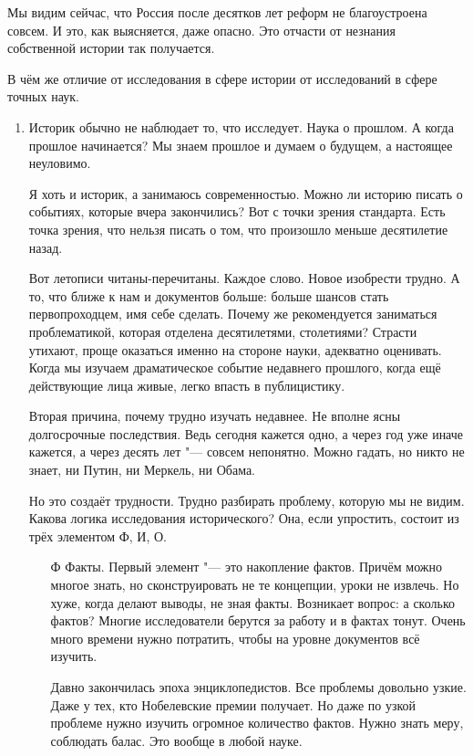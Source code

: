 Мы видим сейчас, что Россия после десятков лет реформ не благоустроена совсем. И это, как выясняется, даже опасно. Это отчасти от незнания собственной истории так получается.

В чём же отличие от исследования в сфере истории от исследований в сфере точных наук.
\begin{enumerate}
\item Историк обычно не наблюдает то, что исследует. Наука о прошлом. А когда прошлое начинается? Мы знаем прошлое и думаем о будущем, а настоящее неуловимо.

Я хоть и историк, а занимаюсь современностью. Можно ли историю писать о событиях, которые вчера закончились? Вот с точки зрения стандарта. Есть точка зрения, что нельзя писать о том, что произошло меньше десятилетие назад.

Вот летописи читаны-перечитаны. Каждое слово. Новое изобрести трудно. А то, что ближе к нам и документов больше: больше шансов стать первопроходцем, имя себе сделать. Почему же рекомендуется заниматься проблематикой, которая отделена десятилетями, столетиями? Страсти утихают, проще оказаться именно на стороне науки, адекватно оценивать. Когда мы изучаем драматическое событие недавнего прошлого, когда ещё действующие лица живые, легко впасть в публицистику.

Вторая причина, почему трудно изучать недавнее. Не вполне ясны долгосрочные последствия. Ведь сегодня кажется одно, а через год уже иначе кажется, а через десять лет "--- совсем непонятно. Можно гадать, но никто не знает, ни Путин, ни Меркель, ни Обама.

Но это создаёт трудности. Трудно разбирать проблему, которую мы не видим. Какова логика исследования исторического? Она, если упростить, состоит из трёх элементом Ф, И, О.
\begin{itemize}
\item[Ф] Факты. Первый элемент "--- это накопление фактов. Причём можно многое знать, но сконструировать не те концепции, уроки не извлечь. Но хуже, когда делают выводы, не зная факты. Возникает вопрос: а сколько фактов? Многие исследователи берутся за работу и в фактах тонут. Очень много времени нужно потратить, чтобы на уровне документов всё изучить.

Давно закончилась эпоха энциклопедистов. Все проблемы довольно узкие. Даже у тех, кто Нобелевские премии получает. Но даже по узкой проблеме нужно изучить огромное количество фактов. Нужно знать меру, соблюдать балас. Это вообще в любой науке.


\end{itemize}
\end{enumerate}
